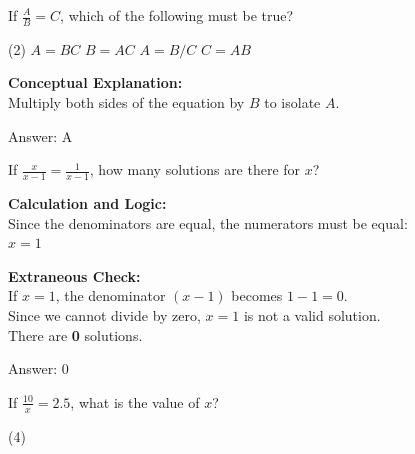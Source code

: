 \documentclass[11pt,paper=a4,answers]{exam}
\begin{document}
\begin{questions}
\vspace{40pt}

\question
If $\frac{A}{B} = C$, which of the following must be true?
\begin{tasks}(2)
    \task $A = BC$
    \task $B = AC$
    \task $A = B/C$
    \task $C = AB$
\end{tasks}

\begin{solution}
\textbf{Conceptual Explanation:} \\
Multiply both sides of the equation by $B$ to isolate $A$.

\vspace{30pt}

Answer: \colorbox{yellow!100}{A}
\end{solution}

\vspace{40pt}

\question
If $\frac{x}{x-1} = \frac{1}{x-1}$, how many solutions are there for $x$?

\begin{solution}
\textbf{Calculation and Logic:} \\
Since the denominators are equal, the numerators must be equal: \\
$x = 1$

\vspace{15pt}

\textbf{Extraneous Check:} \\
If $x = 1$, the denominator $(x-1)$ becomes $1-1=0$. \\
Since we cannot divide by zero, $x=1$ is not a valid solution. \\
There are \textbf{0} solutions.

\vspace{30pt}

Answer: \colorbox{yellow!100}{0}
\end{solution}

\vspace{40pt}

\question
If $\frac{10}{x} = 2.5$, what is the value of $x$?
\begin{tasks}(4)
\end{tasks}


\end{questions}
\end{document}
